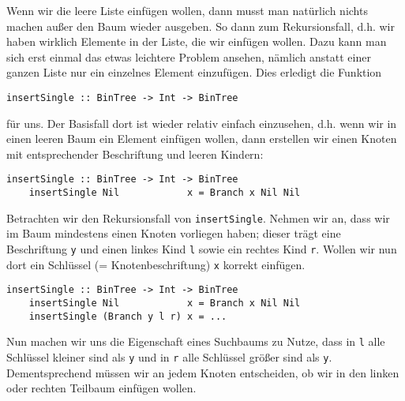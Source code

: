 \documentclass[ngerman, a4paper, 11pt]{article}
\theoremstyle{nonumberplain}
\begin{document}
Wenn wir die leere Liste einfügen wollen, dann musst man natürlich nichts machen außer den Baum wieder ausgeben. 
So dann zum Rekursionsfall, d.h. wir haben wirklich Elemente in der Liste, die wir einfügen wollen. Dazu kann man sich erst einmal das etwas leichtere Problem ansehen, nämlich anstatt einer ganzen Liste nur ein einzelnes Element einzufügen. Dies erledigt die Funktion
\begin{lstlisting}[style=noframe]
	insertSingle :: BinTree -> Int -> BinTree
\end{lstlisting}
für uns. Der Basisfall dort ist wieder relativ einfach einzusehen, d.h. wenn wir in einen leeren Baum ein Element einfügen wollen, dann erstellen wir einen Knoten mit entsprechender Beschriftung und leeren Kindern:
\begin{lstlisting}[style=noframe]
	insertSingle :: BinTree -> Int -> BinTree
	insertSingle Nil            x = Branch x Nil Nil
\end{lstlisting}
Betrachten wir den Rekursionsfall von \texttt{insertSingle}. Nehmen wir an, dass wir im Baum mindestens einen Knoten vorliegen haben; dieser trägt eine Beschriftung \texttt{y} und einen linkes Kind \texttt{l} sowie ein rechtes Kind \texttt{r}. Wollen wir nun dort ein Schlüssel (= Knotenbeschriftung) \texttt{x} korrekt einfügen. 
\begin{lstlisting}[style=noframe]
	insertSingle :: BinTree -> Int -> BinTree
	insertSingle Nil            x = Branch x Nil Nil
	insertSingle (Branch y l r) x = ...
\end{lstlisting}
Nun machen wir uns die Eigenschaft eines Suchbaums zu Nutze, dass in \texttt{l} alle Schlüssel kleiner sind als \texttt{y} und in \texttt{r} alle Schlüssel größer sind als \texttt{y}. Dementsprechend müssen wir an jedem Knoten entscheiden, ob wir in den linken oder rechten Teilbaum einfügen wollen. 
\end{document}
